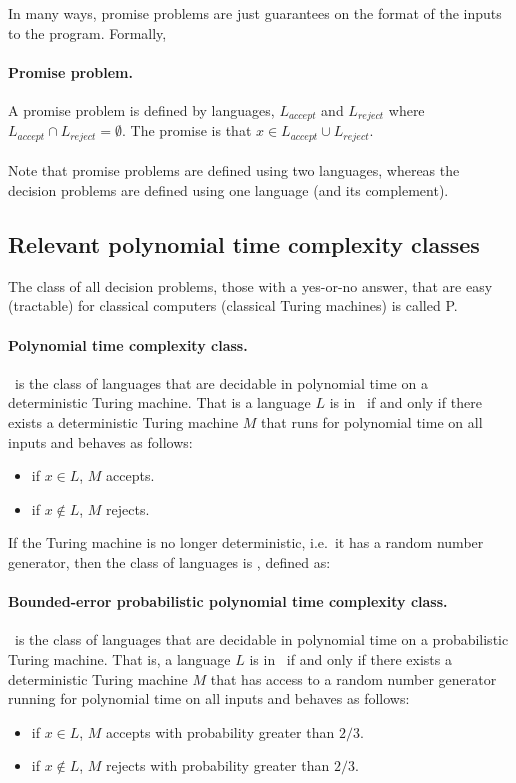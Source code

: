 \documentclass[11pt,oneside,final]{huthesis}%
\begin{document}
In many ways, promise problems are just guarantees on the format of the inputs to the program. Formally,

\paragraph{Promise problem.}
	A promise problem is defined by languages, $L_{accept}$ and $L_{reject}$ where $L_{accept}\cap L_{reject}=\emptyset$. The promise is that $x\in L_{accept}\cup L_{reject}$.

\paragraph*{}
Note that promise problems are defined using two languages, whereas the decision problems are defined using one language (and its complement).



\subsection{Relevant polynomial time complexity classes}
The class of all decision problems, those with a yes-or-no answer, that are easy (tractable) for classical computers (classical Turing machines) is called {P}. %

\paragraph{Polynomial time complexity class.} \p~is the class of languages that are decidable in polynomial time on a deterministic Turing machine.  That is a language $L$ is in \p~if and only if there exists a deterministic Turing machine $M$ that runs for polynomial time on all inputs and behaves as follows:
 	\begin{itemize}
		\item if $x\in L$, $M$ accepts.
		\item if $x\notin L$, $M$ rejects.
	\end{itemize}

If the Turing machine is no longer deterministic, i.e.~it has a random number generator, then the class of languages is \bpp, defined as:

\paragraph{Bounded-error probabilistic polynomial time complexity class.} \bpp~is the class of languages that are decidable in polynomial time on a probabilistic Turing machine.  That is, a language $L$ is in \bpp~if and only if there exists a deterministic Turing machine $M$ that has access to a random number generator running for polynomial time on all inputs and behaves as follows:
			\begin{itemize}
				\item if $x\in L$, $M$ accepts with probability greater than $2/3$.
				\item if $x\notin L$, $M$ rejects with probability greater than $2/3$.
			\end{itemize}
\end{document}
